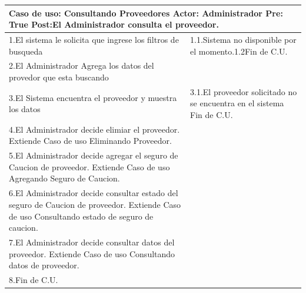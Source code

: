 \begin{longtable}{| p{} | p{} |} 
    \hline
    \multicolumn{2}{|p{16cm}|}{
        \textbf{Caso de uso:} Consultando Proveedores \newline
        \textbf{Actor:} Administrador\newline
        \textbf{Pre:}  True\newline
        \textbf{Post:}El Administrador consulta el proveedor.
    }\\
    \hline
    1.El sistema le solicita que ingrese los filtros de busqueda  & 1.1.Sistema no  disponible por el momento.\newline 1.2Fin de C.U.\\
    \hline
    2.El Administrador Agrega los datos del provedor que esta buscando& \\
    \hline
    3.El Sistema encuentra el proveedor y muestra los datos & 3.1.El proveedor solicitado no se encuentra en el sistema \newline 3.2 Fin de C.U.  \\
    \hline
    4.El Administrador decide elimiar el proveedor. Extiende Caso de uso Eliminando Proveedor.& \\
    \hline
    5.El Administrador decide agregar el seguro de Caucion de proveedor. Extiende Caso de uso Agregando Seguro de Caucion.& \\
    \hline
    6.El Administrador decide consultar estado del seguro de Caucion de proveedor. Extiende Caso de uso Consultando estado de seguro de caucion.& \\
    \hline
    7.El Administrador decide consultar datos del proveedor. Extiende Caso de uso Consultando datos de proveedor.& \\
    \hline
    8.Fin de C.U.& \\
    \hline
\end{longtable}

